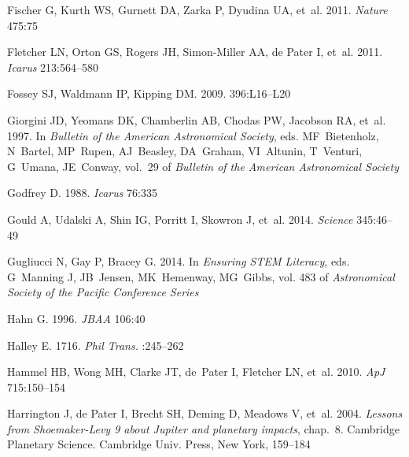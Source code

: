 \documentclass{ar2e}
\begin{document}
\begin{thebibliography}{}
{Fischer} G, {Kurth} WS, {Gurnett} DA, {Zarka} P, {Dyudina} UA, et~al. 2011.
\newblock \textit{{Nature}} 475:75

{Fletcher} LN, {Orton} GS, {Rogers} JH, {Simon-Miller} AA, {de Pater} I, et~al.
  2011.
\newblock \textit{Icarus} 213:564--580

{Fossey} SJ, {Waldmann} IP, {Kipping} DM. 2009.
\newblock \textit{\mnras} 396:L16--L20

{Giorgini} JD, {Yeomans} DK, {Chamberlin} AB, {Chodas} PW, {Jacobson} RA,
  et~al. 1997.
\newblock In \textit{Bulletin of the American Astronomical Society}, eds.
  MF~{Bietenholz}, N~{Bartel}, MP~{Rupen}, AJ~{Beasley}, DA~{Graham},
  VI~{Altunin}, T~{Venturi}, G~{Umana}, JE~{Conway}, vol.~29 of
  \textit{Bulletin of the American Astronomical Society}

{Godfrey} D. 1988.
\newblock \textit{{Icarus}} 76:335

{Gould} A, {Udalski} A, {Shin} IG, {Porritt} I, {Skowron} J, et~al. 2014.
\newblock \textit{Science} 345:46--49

{Gugliucci} N, {Gay} P, {Bracey} G. 2014.
\newblock In \textit{Ensuring STEM Literacy}, eds. G~{Manning} J, JB~{Jensen},
  MK~{Hemenway}, MG~{Gibbs}, vol. 483 of \textit{Astronomical Society of the
  Pacific Conference Series}

{Hahn} G. 1996.
\newblock \textit{{JBAA}} 106:40

{Halley} E. 1716.
\newblock \textit{Phil Trans.} :245--262

Hammel HB, Wong MH, Clarke JT, de~Pater I, Fletcher LN, et~al. 2010.
\newblock \textit{ApJ} 715:150--154

{Harrington} J, {de Pater} I, {Brecht} SH, {Deming} D, {Meadows} V, et~al.
  2004.
\newblock \textit{{Lessons from Shoemaker-Levy 9 about Jupiter and planetary
  impacts}}, chap.~8.
\newblock Cambridge Planetary Science. Cambridge Univ. Press, New York,
  159--184


\end{thebibliography}
\end{document}
